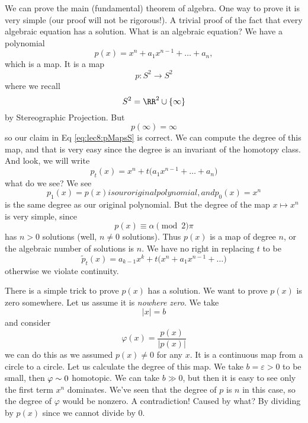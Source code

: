 We can prove the main (fundamental) theorem of algebra. One way
to prove it is very simple (our proof will not be rigorous!). A
trivial proof of the fact that every algebraic equation has a
solution. What is an algebraic equation? We have a polynomial
\begin{equation}
p(x)=x^{n}+a_{1}x^{n-1}+\dots+a_{n},
\end{equation}
which is a map. It is a map
\begin{equation}\label{eq:lec8:pMapsS}
p\colon S^2\to S^2
\end{equation}
where we recall
\begin{equation}
S^2=\RR^2\cup\{\infty\}
\end{equation}
by Stereographic Projection.
But
\begin{equation}
p(\infty)=\infty
\end{equation}
so our claim in Eq \eqref{eq:lec8:pMapsS} is correct. We can
compute the degree of this map, and that is very easy since the
degree is an invariant of the homotopy class. And look, we will
write
\begin{equation}
p_{t}(x)=x^{n}+t\bigl(a_{1}x^{n-1}+\dots+a_{n}\bigr)
\end{equation}
what do we see? We see
\begin{subequations}
\begin{equation}
p_{1}(x)=p(x)
\end{equation}
is our original polynomial, and
\begin{equation}
p_{0}(x)=x^{n}
\end{equation}
\end{subequations}
is the same degree as our original polynomial. But the degree of
the map $x\mapsto x^n$ is very simple, since
\begin{equation}
p(x)\equiv\alpha\pmod2\pi
\end{equation}
has $n>0$ solutions (well, $n\not=0$ solutions). Thus $p(x)$ is a
map of degree $n$, or the algebraic number of solutions is
$n$. We have no right in replacing $t$ to be
\begin{equation}
\widetilde{p}_{t}(x)=a_{k-1}x^{k}+t\bigl(x^{n}+a_{1}x^{n-1}+\dots\bigr)
\end{equation}
otherwise we violate continuity.

There is a simple trick to prove $p(x)$ has a solution. We want
to prove $p(x)$ is zero somewhere. Let us assume it is
\emph{nowhere zero}. We take
\begin{equation}
|x|=b
\end{equation}
and consider
\begin{equation}
\varphi(x)=\frac{p(x)}{|p(x)|}
\end{equation}
we can do this as we assumed $p(x)\not=0$ for any $x$. It is a
continuous map from a circle to a circle. Let us calculate the
degree of this map. We take $b=\varepsilon>0$ to be small, then
$\varphi\sim0$ homotopic. We can take $b\gg0$, but then
it is easy to see only the first term $x^n$ dominates. We've seen
that the degree of $p$ is $n$ in this case, so the degree of
$\varphi$ would be nonzero. A contradiction! Caused by what? By
dividing by $p(x)$ since we cannot divide by 0.

